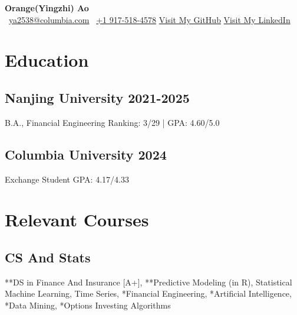\documentclass[a4paper]{article}
\newcommand{\org}{\color{org}}
\begin{document}
\fontsize{12pt}{16pt}\selectfont
\begin{center}      
    {\fontsize{25}{25}\selectfont\bfseries Orange(Yingzhi) Ao} \\ \vspace{9pt}
    {\org\faEnvelope[regular]}\ \href{mailto:ya2538@columbia.edu}{ya2538@columbia.com} \hfill
    {\org{}}\ \href{tel:+1 9175184578}{+1 917-518-4578} \hfill
    {\org\faGithub} \href{https://github.com/OrangeAoo}{Visit My GitHub}  \hfill
    {\org\faLinkedin} \href{http://linkedin.com/in/orange-ao}{Visit My LinkedIn}
\end{center}




\section{Education}  %

\subsection{Nanjing University \normalfont \hfill 2021-2025}
B.A., Financial Engineering \hfill Ranking: 3/29 | GPA: 4.60/5.0

\subsection{Columbia University  \normalfont \hfill 2024}
Exchange Student \hfill GPA: 4.17/4.33

\section{Relevant Courses}
\subsection{CS And Stats}
**DS in Finance And Insurance {\small[A+]}, **Predictive Modeling {\small(in R)}, Statistical Machine Learning, Time Series, *Financial Engineering, *Artificial Intelligence, *Data Mining, *Options Investing Algorithms
\end{document}
